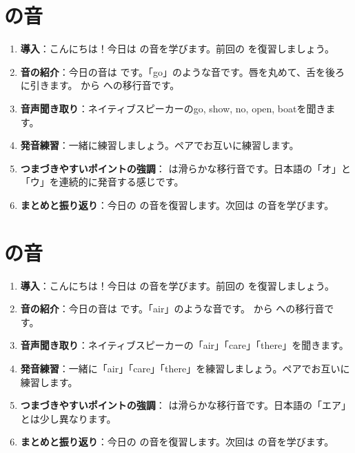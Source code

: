 \documentclass[book,jafontscale=0.9247]{jlreq}
\begin{document}
\section{ の音}
\begin{enumerate}
    \item \textbf{導入}：こんにちは！今日は  の音を学びます。前回の  を復習しましょう。
    \item \textbf{音の紹介}：今日の音は  です。「go」のような音です。唇を丸めて、舌を後ろに引きます。  から  への移行音です。
    \item \textbf{音声聞き取り}：ネイティブスピーカーのgo, show, no, open, boatを聞きます。
    \item \textbf{発音練習}：一緒に練習しましょう。ペアでお互いに練習します。
    \item \textbf{つまづきやすいポイントの強調}：  は滑らかな移行音です。日本語の「オ」と「ウ」を連続的に発音する感じです。
    \item \textbf{まとめと振り返り}：今日の  の音を復習します。次回は  の音を学びます。
\end{enumerate}
\newpage







\section{ の音}
\begin{enumerate}
    \item \textbf{導入}：こんにちは！今日は  の音を学びます。前回の  を復習しましょう。
    \item \textbf{音の紹介}：今日の音は  です。「air」のような音です。  から  への移行音です。
    \item \textbf{音声聞き取り}：ネイティブスピーカーの「air」「care」「there」を聞きます。
    \item \textbf{発音練習}：一緒に「air」「care」「there」を練習しましょう。ペアでお互いに練習します。
    \item \textbf{つまづきやすいポイントの強調}：  は滑らかな移行音です。日本語の「エア」とは少し異なります。
    \item \textbf{まとめと振り返り}：今日の  の音を復習します。次回は  の音を学びます。
\end{enumerate}
\end{document}
